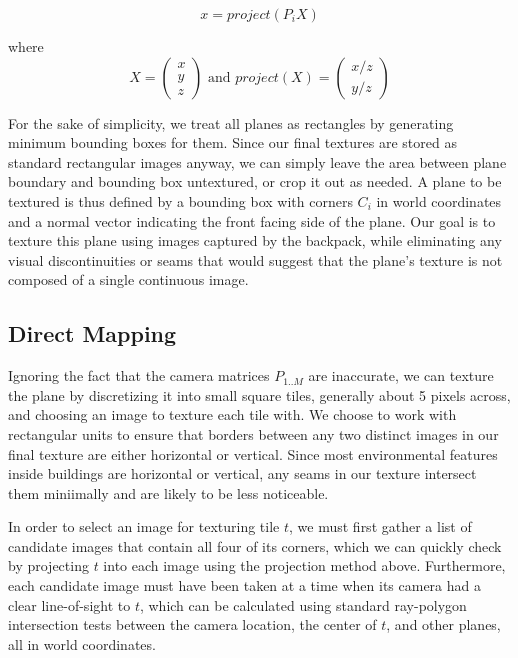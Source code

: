 \documentclass[10pt,twocolumn,letterpaper]{article}
\begin{document}
\[
x=project(P_iX)
\]

where
\[X = \begin{pmatrix} x \\ y \\ z \end{pmatrix} \textrm{ and }
project(X) = \begin{pmatrix} x/z \\ y/z \end{pmatrix}
\]

For the sake of simplicity, we treat all planes as rectangles by
generating minimum bounding boxes for them. Since our final textures
are stored as standard rectangular images anyway, we can simply
leave the area between plane boundary and bounding box untextured, or
crop it out as needed. A plane to be textured is thus defined by a
bounding box with corners $C_i$ in world coordinates and a normal
vector indicating the front facing side of the plane. Our goal is to
texture this plane using images captured by the backpack, while
eliminating any visual discontinuities or seams that would suggest
that the plane's texture is not composed of a single continuous
image.

\subsection{Direct Mapping}
\label{sec:directMapping}

Ignoring the fact that the camera matrices $P_{1..M}$ are inaccurate,
we can texture the plane by discretizing it into small square tiles,
generally about 5 pixels across, and choosing an image to texture each
tile with. We choose to work with rectangular units to ensure that
borders between any two distinct images in our final texture are
either horizontal or vertical. Since most environmental features
inside buildings are horizontal or vertical, any seams in our texture
intersect them miniimally and are likely to be less noticeable.

In order to select an image for texturing tile $t$, we must first
gather a list of candidate images that contain all four of its
corners, which we can quickly check by projecting $t$ into each image
using the projection method above. Furthermore, each candidate image
must have been taken at a time when its camera had a clear
line-of-sight to $t$, which can be calculated using standard
ray-polygon intersection tests between the camera location, the center
of $t$, and other planes, all in world coordinates.
\end{document}
